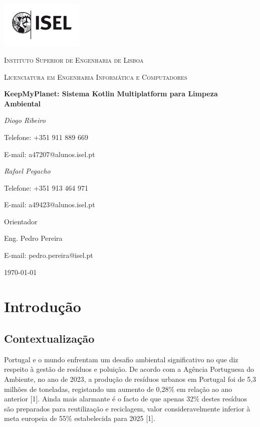 \documentclass[a4paper,11pt]{article}
\begin{document}
\begin{titlepage}
    \centering
    \includegraphics[width=0.30\textwidth]{logo-isel.png}\par\vspace{1cm}
    {\LARGE \textsc{Instituto Superior de Engenharia de Lisboa}\par}
    \vspace{1cm}
    {\large \textsc{Licenciatura em Engenharia Informática e Computadores}\par}
    \vspace{1.5cm}
    {\huge\bfseries KeepMyPlanet: Sistema Kotlin Multiplatform para Limpeza Ambiental\par}
    \vspace{2cm}
    {\Large\itshape Diogo Ribeiro\par}
    {\large Telefone: +351 911 889 669 \par}
    {\large E-mail: a47207@alunos.isel.pt\par}
    \vspace{0.5cm}
    {\Large\itshape Rafael Pegacho\par}
    {\large Telefone: +351 913 464 971 \par}
    {\large E-mail: a49423@alunos.isel.pt\par}
    \vfill
    Orientador\par
    Eng. Pedro Pereira\par
    E-mail: pedro.pereira@isel.pt\par
    \vfill
    {\large \today\par}
\end{titlepage}

\section{Introdução}
\subsection{Contextualização}
Portugal e o mundo enfrentam um desafio ambiental significativo no que diz respeito à gestão de resíduos e poluição. De acordo com a Agência Portuguesa do Ambiente, no ano de 2023, a produção de resíduos urbanos em Portugal foi de 5,3 milhões de toneladas, registando um aumento de 0,28\% em relação ao ano anterior [1]. Ainda mais alarmante é o facto de que apenas 32\% destes resíduos são preparados para reutilização e reciclagem, valor consideravelmente inferior à meta europeia de 55\% estabelecida para 2025 [1].
\end{document}
